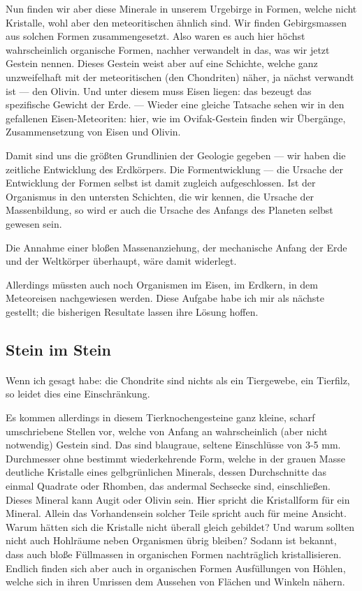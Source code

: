\documentclass[a4paper, 12pt, oneside]{article}
\begin{document}
Nun finden wir aber diese Minerale in unserem Urgebirge in Formen, welche nicht Kristalle, wohl aber den meteoritischen ähnlich sind. Wir finden Gebirgsmassen aus solchen Formen zusammengesetzt. Also waren es auch hier höchst wahrscheinlich organische Formen, nachher verwandelt in das, was wir jetzt Gestein nennen. Dieses Gestein weist aber auf eine Schichte, welche ganz unzweifelhaft mit der meteoritischen (den Chondriten) näher, ja nächst verwandt ist — den Olivin. Und unter diesem muss Eisen liegen: das bezeugt das spezifische Gewicht der Erde. — Wieder eine gleiche Tatsache sehen wir in den gefallenen Eisen-Meteoriten: hier, wie im Ovifak-Gestein finden wir Übergänge, Zusammensetzung von Eisen und Olivin.

Damit sind uns die größten Grundlinien der Geologie gegeben — wir haben die zeitliche Entwicklung des Erdkörpers. Die Formentwicklung — die Ursache der Entwicklung der Formen selbst ist damit zugleich aufgeschlossen. Ist der Organismus in den untersten Schichten, die wir kennen, die Ursache der Massenbildung, so wird er auch die Ursache des Anfangs des Planeten selbst gewesen sein.

Die Annahme einer bloßen Massenanziehung, der mechanische Anfang der Erde und der Weltkörper überhaupt, wäre damit widerlegt.

Allerdings müssten auch noch Organismen im Eisen, im Erdkern, in dem Meteoreisen nachgewiesen werden. Diese Aufgabe habe ich mir als nächste gestellt; die bisherigen Resultate lassen ihre Lösung hoffen.
\clearpage
\subsection{Stein im Stein}
\paragraph{}
Wenn ich gesagt habe: die Chondrite sind nichts als ein Tiergewebe, ein Tierfilz, so leidet dies eine Einschränkung.

Es kommen allerdings in diesem Tierknochengesteine ganz kleine, scharf umschriebene Stellen vor, welche von Anfang an wahrscheinlich (aber nicht notwendig) Gestein sind. Das sind blaugraue, seltene Einschlüsse von 3-5 mm. Durchmesser ohne bestimmt wiederkehrende Form, welche in der grauen Masse deutliche Kristalle eines gelbgrünlichen Minerals, dessen Durchschnitte das einmal Quadrate oder Rhomben, das andermal Sechsecke sind, einschließen. Dieses Mineral kann Augit oder Olivin sein. Hier spricht die Kristallform für ein Mineral. Allein das Vorhandensein solcher Teile spricht auch für meine Ansicht. Warum hätten sich die Kristalle nicht überall gleich gebildet? Und warum sollten nicht auch Hohlräume neben Organismen übrig bleiben? Sodann ist bekannt, dass auch bloße Füllmassen in organischen Formen nachträglich kristallisieren. Endlich finden sich aber auch in organischen Formen Ausfüllungen von Höhlen, welche sich in ihren Umrissen dem Aussehen von Flächen und Winkeln nähern.
\end{document}

